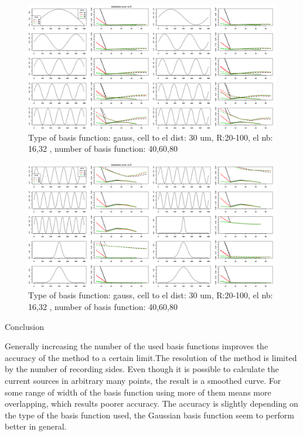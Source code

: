 \documentclass[12pt,a4paper]{article}
\begin{document}
\begin{figure}[h]
\includegraphics[width=15cm]{plots/error_Rtest_gauss2_patt3_12_el_both.png}
\caption{Type of basis function: gauss, cell to el dist: 30 um, R:20-100, el nb: 16,32 , number of basis function: 40,60,80}
\label{fig:error_gauss}
\end{figure}

\begin{figure}[h]
\includegraphics[width=15cm]{plots/error_Rtest_gauss2_patt13_22_el_both.png}
\caption{Type of basis function: gauss, cell to el dist: 30 um, R:20-100, el nb: 16,32 , number of basis function: 40,60,80}
\label{fig:error_gauss2}
\end{figure}

Conclusion

Generally increasing the number of the used basis functions improves the accuracy of the method to a certain limit.The resolution of the method is limited by the number of recording sides. Even though it is possible to calculate the current sources in arbitrary many points, the result is a smoothed curve. For some range of width of the basis function using more of them means more overlapping, which results poorer accuracy. The accuracy is slightly depending on the type of the basis function used, the Gaussian basis function seem to perform better in general.
\end{document}
